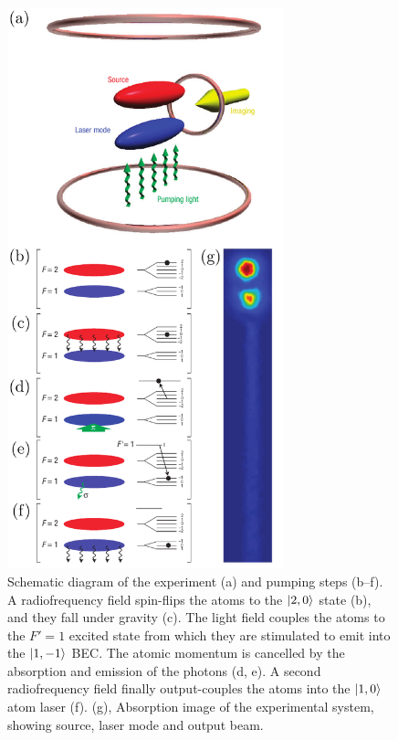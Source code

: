 \begin{figure}
    \centering
    \includegraphics[width=8cm]{ExperimentSchematic}
    \caption{Schematic diagram of the experiment (a) and pumping steps (b--f).  A radiofrequency field spin-flips the atoms to the ${\left|2, 0\right>}$ state (b), and they fall under gravity (c).  The light field couples the atoms to the $F'=1$ excited state from which they are stimulated to emit into the ${\left|1, -1\right>}$ BEC.  The atomic momentum is cancelled by the absorption and emission of the photons (d, e).  A second radiofrequency field finally output-couples the atoms into the ${\left|1, 0\right>}$ atom laser (f).  (g), Absorption image of the experimental system, showing source, laser mode and output beam.}
    \label{OpticalPumping:ExperimentSchematic}
\end{figure}


